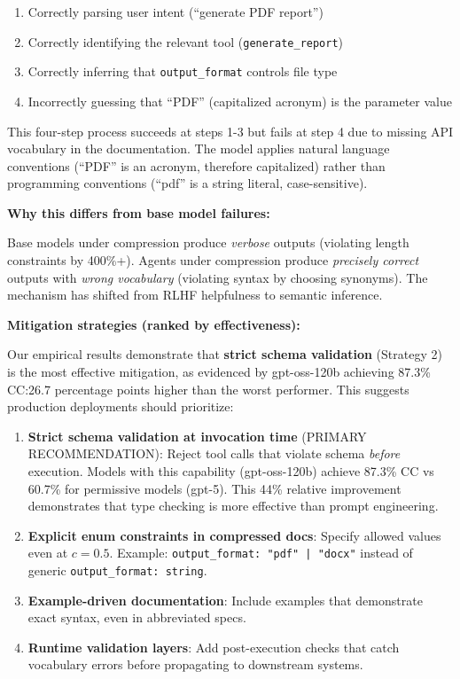 \documentclass[11pt]{article}
\begin{document}
\begin{enumerate}
\item Correctly parsing user intent (``generate PDF report'')
\item Correctly identifying the relevant tool (\texttt{generate\_report})
\item Correctly inferring that \texttt{output\_format} controls file type
\item Incorrectly guessing that ``PDF'' (capitalized acronym) is the parameter value
\end{enumerate}

This four-step process succeeds at steps 1-3 but fails at step 4 due to missing API vocabulary in the documentation. The model applies natural language conventions (``PDF'' is an acronym, therefore capitalized) rather than programming conventions (``pdf'' is a string literal, case-sensitive).

\textbf{Why this differs from base model failures:}

Base models under compression produce \emph{verbose} outputs (violating length constraints by 400\%+). Agents under compression produce \emph{precisely correct} outputs with \emph{wrong vocabulary} (violating syntax by choosing synonyms). The mechanism has shifted from RLHF helpfulness to semantic inference.

\textbf{Mitigation strategies (ranked by effectiveness):}

Our empirical results demonstrate that \textbf{strict schema validation} (Strategy 2) is the most effective mitigation, as evidenced by gpt-oss-120b achieving 87.3\% CC:26.7 percentage points higher than the worst performer. This suggests production deployments should prioritize:

\begin{enumerate}
\item \textbf{Strict schema validation at invocation time} (PRIMARY RECOMMENDATION): Reject tool calls that violate schema \emph{before} execution. Models with this capability (gpt-oss-120b) achieve 87.3\% CC vs 60.7\% for permissive models (gpt-5). This 44\% relative improvement demonstrates that type checking is more effective than prompt engineering.

\item \textbf{Explicit enum constraints in compressed docs}: Specify allowed values even at $c=0.5$. Example: \texttt{output\_format: "pdf" | "docx"} instead of generic \texttt{output\_format: string}.

\item \textbf{Example-driven documentation}: Include examples that demonstrate exact syntax, even in abbreviated specs.

\item \textbf{Runtime validation layers}: Add post-execution checks that catch vocabulary errors before propagating to downstream systems.
\end{enumerate}
\end{document}
